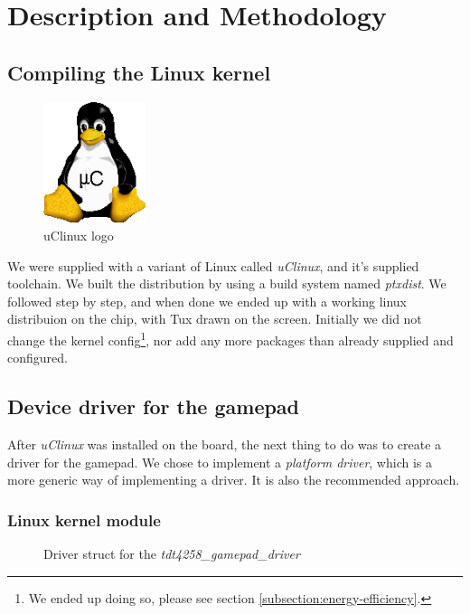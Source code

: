 \section{Description and Methodology}

\subsection{Compiling the Linux kernel}
\begin{figure}[h]
	\centering
	\includegraphics[width=3cm]{img/uclinux.png}
	\caption{uClinux logo}
	\label{fig:uclinux}
\end{figure}
We were supplied with a variant of Linux called \emph{uClinux}, and it's supplied toolchain. We built the distribution by using a build system named \emph{ptxdist}. We followed \cite[section 5.3]{compendium} step by step, and when done we ended up with a working linux distribuion on the chip, with Tux drawn on the screen. Initially we did not change the kernel config\footnote{We ended up doing so, please see section \ref{subsection:energy-efficiency}.}, nor add any more packages than already supplied and configured.

\subsection{Device driver for the gamepad}
After \emph{uClinux} was installed on the board, the next thing to do was to create a driver for the gamepad. We chose to implement a \emph{platform driver}, which is a more generic way of implementing a driver. It is also the recommended approach.
\subsubsection{Linux kernel module}

\begin{figure}[h]
	\centering
	
	\caption{Driver struct for the \emph{tdt4258\_gamepad\_driver}}
	\label{fig:tdt4258-gamepad-driver}
\end{figure}

